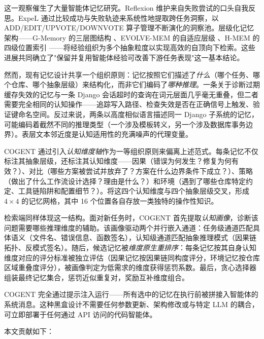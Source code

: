 \documentclass[UTF8,twocolumn]{ctexart}
\begin{document}
这一观察催生了大量智能体记忆研究。Reflexion \cite{reflexion} 维护来自失败尝试的口头自我反思。ExpeL \cite{expel} 通过比较成功与失败轨迹来系统性地提取跨任务洞察，以 ADD/EDIT/UPVOTE/DOWNVOTE 算子管理不断演化的洞察池。层级化记忆架构——G-Memory 的三层图结构 \cite{g-memory}、EVOLVE-MEM 的自适应层级 \cite{evolve-mem}、H-MEM 的四级位置索引 \cite{h-mem}——将经验组织为多个抽象粒度以实现高效的自顶向下检索。这些进展共同确立了"保留并复用智能体经验可改善下游任务表现"这一基本结论。

然而，现有记忆设计共享一个组织原则：记忆按照它们描述了\emph{什么}（哪个任务、哪个仓库、哪个抽象层级）来结构化，而非它们编码了\emph{哪种推理}。一条关于诊断过期缓存失效的记忆与一条 Django 会话超时的查询在词元层面几乎毫无重叠，但二者需要完全相同的认知操作——追踪写入路径、检查失效是否在正确信号上触发、验证键命名空间。反过来说，两条以高度相似语言描述同一 Django 子系统的记忆，可能编码着截然不同的推理类型（一个涉及模板转义，另一个涉及数据库事务边界）。表层文本邻近度是认知适用性的充满噪声的代理变量。

\textsc{COGENT} 通过引入\emph{认知维度轴}作为一等组织原则来偏离上述范式。每条记忆不仅标注其抽象层级，还标注其认知维度——因果（错误为何发生？修复为何有效？）、对比（哪些方案被尝试并放弃了？方案在什么边界条件下成立？）、策略（做出了什么工作流设计选择？理由是什么？）和环境（遇到了哪些仓库特定约定、工具链陷阱和配置细节？）。将这四个认知维度与四个抽象层级交叉，形成 $4 \times 4$ 的记忆网格，其中 16 个位置各自存放一类独特的操作性知识。

检索端同样体现这一结构。面对新任务时，\textsc{COGENT} 首先提取\emph{认知画像}，诊断该问题需要哪些推理维度的辅助。该画像驱动两个并行嵌入通道：任务级通道匹配具体语义（文件名、错误信息、函数签名），认知级通道匹配抽象推理模式（因果链拓扑、反模式签名）。随后，候选记忆被\emph{维度原生重排序}：每条记忆按其自身认知维度对应的评分标准被独立评估（因果记忆按因果链同构度评分，环境记忆按仓库区域重叠度评分），被画像判定为低需求的维度获得惩罚系数。最后，贪心选择器组装最终记忆集合，惩罚近似重复对，奖励互补维度组合。

\textsc{COGENT} 完全通过提示注入运行——所有选中的记忆在执行前被拼接入智能体的系统消息。这种黑盒设计不需要任何参数更新、架构修改或与特定 LLM 的耦合，可立即部署于任何通过 API 访问的代码智能体。

本文贡献如下：
\end{document}
